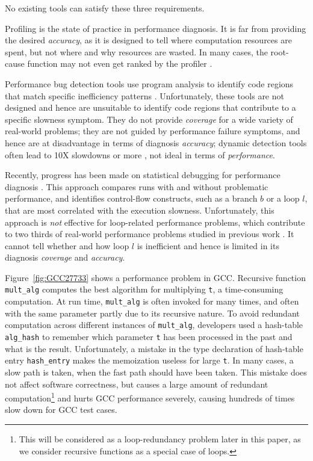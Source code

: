 No existing tools can satisfy these
three requirements.

Profiling is the state of practice in performance diagnosis.
It is far from providing the desired \textit{accuracy}, as it is designed to
tell where computation resources are spent, 
but not where and why resources are wasted. 
In many cases, the root-cause function may not even
get ranked by the profiler \cite{SongOOPSLA2014}.

Performance bug detection tools use program analysis to identify
code regions that match specific inefficiency patterns 
\cite{Alabama,CARAMEL, Cachetor,Xu:2010:FLD:1806596.1806617,Dufour:2008:STC:1453101.1453111, Xu:2009:GFP:1542476.1542523, Xu:2010:DIC:1806596.1806616,IsilDillig.PLDI15}. 
Unfortunately, these tools are not designed and hence are unsuitable
to identify code regions that contribute to a specific slowness symptom.
They do not provide \textit{coverage} for a wide
variety of real-world problems; they are not guided by
performance failure symptoms, and hence are at disadvantage in terms of diagnosis
\textit{accuracy}; dynamic detection tools often lead to 
10X slowdowns or more \cite{Cachetor,Xu:2010:FLD:1806596.1806617,Alabama}, 
not ideal in terms of \textit{performance}.

Recently, progress has been made on statistical debugging for
performance diagnosis \cite{SongOOPSLA2014}.
This approach compares runs with and without problematic performance, and
identifies control-flow constructs, such as a branch $b$ or 
a loop $l$, that are most correlated with
the execution slowness.
Unfortunately, this approach is \textit{not} effective
for loop-related 
performance problems, which contribute to two thirds of
real-world performance problems studied in previous work 
\cite{SongOOPSLA2014,PerfBug}. It cannot
tell whether and how loop $l$ is inefficient 
and hence is limited in its diagnosis \textit{coverage} and \textit{accuracy}.

Figure~\ref{fig:GCC27733} shows a performance problem in GCC. 
Recursive function \texttt{mult\_alg} computes the best algorithm for 
multiplying \texttt{t}, a time-consuming computation. 
At run time, \texttt{mult\_alg} is often invoked for many times, and often
with the same parameter partly due to its recursive nature.
To avoid redundant computation across different instances of
\texttt{mult\_alg}, developers used a
hash-table
\texttt{alg\_hash} to remember which parameter \texttt{t} has been processed
in the past and what is the result. 
Unfortunately, a mistake in the type declaration of hash-table
entry \texttt{hash\_entry} makes the memoization useless for large \texttt{t}.
In many cases, a slow path is taken, when the fast path should have been taken.
This mistake does not affect software correctness, but causes a large amount
of redundant computation\footnote{This will be considered as a
loop-redundancy problem later in this paper, as we consider
recursive functions as a special case of loops.} 
and hurts GCC performance severely,
causing hundreds of times slow down for GCC test cases.

